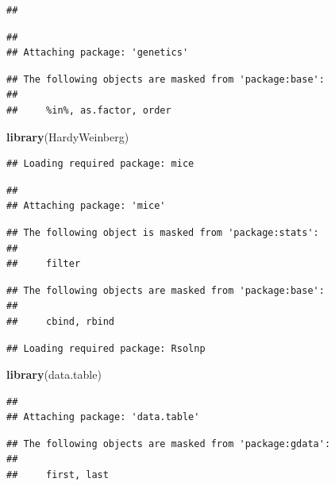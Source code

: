 \documentclass[
]{article}
\newenvironment{Shaded}{\begin{snugshade}}{\end{snugshade}}
\newcommand{\KeywordTok}[1]{\textcolor[rgb]{0.13,0.29,0.53}{\textbf{#1}}}
\newcommand{\NormalTok}[1]{#1}
\begin{document}
\begin{verbatim}
## 
\end{verbatim}

\begin{verbatim}
## 
## Attaching package: 'genetics'
\end{verbatim}

\begin{verbatim}
## The following objects are masked from 'package:base':
## 
##     %in%, as.factor, order
\end{verbatim}

\begin{Shaded}
\begin{Highlighting}[]
\KeywordTok{library}\NormalTok{(HardyWeinberg)}
\end{Highlighting}
\end{Shaded}

\begin{verbatim}
## Loading required package: mice
\end{verbatim}

\begin{verbatim}
## 
## Attaching package: 'mice'
\end{verbatim}

\begin{verbatim}
## The following object is masked from 'package:stats':
## 
##     filter
\end{verbatim}

\begin{verbatim}
## The following objects are masked from 'package:base':
## 
##     cbind, rbind
\end{verbatim}

\begin{verbatim}
## Loading required package: Rsolnp
\end{verbatim}

\begin{Shaded}
\begin{Highlighting}[]
\KeywordTok{library}\NormalTok{(data.table)}
\end{Highlighting}
\end{Shaded}

\begin{verbatim}
## 
## Attaching package: 'data.table'
\end{verbatim}

\begin{verbatim}
## The following objects are masked from 'package:gdata':
## 
##     first, last
\end{verbatim}
\end{document}
